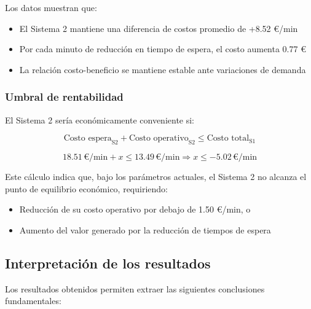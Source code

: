\documentclass[a4paper, 12pt]{article}
\begin{document}
  Los datos muestran que:
  \begin{itemize}
  	\item El Sistema 2 mantiene una diferencia de costos promedio de +8.52 €/min
  	\item Por cada minuto de reducción en tiempo de espera, el costo aumenta 0.77 €
  	\item La relación costo-beneficio se mantiene estable ante variaciones de demanda
  \end{itemize}
  
  \subsubsection{Umbral de rentabilidad}
  
  El Sistema 2 sería económicamente conveniente si:
  
  \begin{equation}
  	\text{Costo espera}_{\text{S2}} + \text{Costo operativo}_{\text{S2}} \leq \text{Costo total}_{\text{S1}}
  \end{equation}
  
  \begin{equation}
  	18.51\,\text{€/min} + x \leq 13.49\,\text{€/min} \Rightarrow x \leq -5.02\,\text{€/min}
  \end{equation}
  
  Este cálculo indica que, bajo los parámetros actuales, el Sistema 2 no alcanza el punto de equilibrio económico, requiriendo:
  \begin{itemize}
  	\item Reducción de su costo operativo por debajo de 1.50 €/min, o
  	\item Aumento del valor generado por la reducción de tiempos de espera
  \end{itemize}
  
  
  
  \subsection{Interpretación de los resultados}
  
  Los resultados obtenidos permiten extraer las siguientes conclusiones fundamentales:
  
\end{document}
